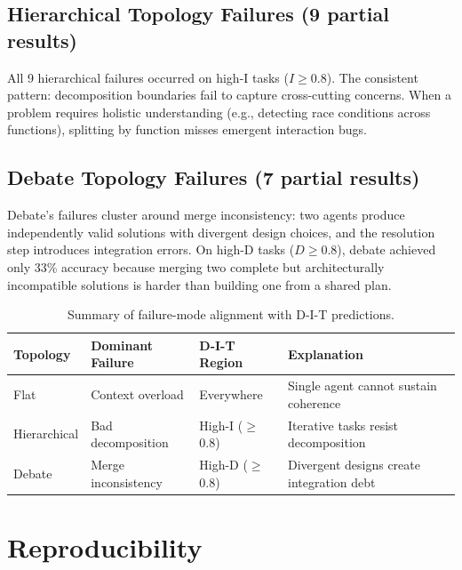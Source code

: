 \subsection{Hierarchical Topology Failures (9 partial results)}

All 9 hierarchical failures occurred on high-I tasks ($I \geq 0.8$). The consistent pattern: decomposition boundaries fail to capture cross-cutting concerns. When a problem requires holistic understanding (e.g., detecting race conditions across functions), splitting by function misses emergent interaction bugs.

\subsection{Debate Topology Failures (7 partial results)}

Debate's failures cluster around merge inconsistency: two agents produce independently valid solutions with divergent design choices, and the resolution step introduces integration errors. On high-D tasks ($D \geq 0.8$), debate achieved only 33\% accuracy because merging two complete but architecturally incompatible solutions is harder than building one from a shared plan.

\begin{table}[h]
\centering
\caption{Summary of failure-mode alignment with D-I-T predictions.}
\label{tab:failure_summary}
\small
\begin{tabular}{llll}
\toprule
\textbf{Topology} & \textbf{Dominant Failure} & \textbf{D-I-T Region} & \textbf{Explanation} \\
\midrule
Flat & Context overload & Everywhere & Single agent cannot sustain coherence \\
Hierarchical & Bad decomposition & High-I ($\geq$0.8) & Iterative tasks resist decomposition \\
Debate & Merge inconsistency & High-D ($\geq$0.8) & Divergent designs create integration debt \\
\bottomrule
\end{tabular}
\end{table}

\section{Reproducibility}
\label{app:reproducibility}

